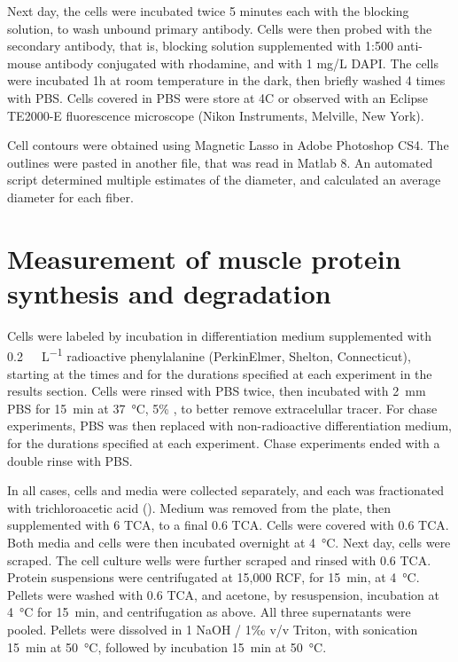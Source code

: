 \documentclass[12pt,english]{report}\usepackage[]{graphicx}\usepackage[]{color}
\begin{document}
Next day, the cells were incubated twice 5 minutes each with the blocking
solution, to wash unbound primary antibody. Cells were then probed
with the secondary antibody, that is, blocking solution supplemented
with 1:500 anti-mouse antibody conjugated with rhodamine, and with
1 mg/L DAPI. The cells were incubated 1h at room temperature in the
dark, then briefly washed 4 times with PBS. Cells covered in PBS were
store at 4C or observed with an Eclipse TE2000-E fluorescence microscope
(Nikon Instruments, Melville, New York).

Cell contours were obtained using Magnetic Lasso in Adobe Photoshop
CS4. The outlines were pasted in another file, that was read in Matlab
8. An automated script determined multiple estimates of the diameter,
and calculated an average diameter for each fiber.


\section{Measurement of muscle protein synthesis and degradation}

Cells were labeled by incubation in differentiation medium supplemented
with \SI{0.2}{\milli\curie\per\liter} radioactive phenylalanine (PerkinElmer,
Shelton, Connecticut), starting at the times and for the durations
specified at each experiment in the results section. Cells were rinsed
with PBS twice, then incubated with \SI{2}{\milli\meter} PBS for
\SI{15}{\minute} at \SI{37}{\celsius}, 5\% , to better
remove extracelullar tracer. For chase experiments, PBS was then replaced
with non-radioactive differentiation medium, for the durations specified
at each experiment. Chase experiments ended with a double rinse with
PBS.

In all cases, cells and media were collected separately, and each
was fractionated with trichloroacetic acid ().
Medium was removed from the plate, then supplemented with \SI{6}{\molar}
TCA, to a final \SI{0.6}{\molar} TCA. Cells were covered with \SI{0.6}{\molar}
TCA. Both media and cells were then incubated overnight at \SI{4}{\celsius}.
Next day, cells were scraped. The cell culture wells were further
scraped and rinsed with \SI{0.6}{\molar} TCA. Protein suspensions
were centrifugated at 15,000 RCF, for \SI{15}{\minute}, at \SI{4}{\celsius}.
Pellets were washed with \SI{0.6}{\molar} TCA, and acetone, by resuspension,
incubation at \SI{4}{\celsius} for \SI{15}{\minute}, and centrifugation
as above. All three supernatants were pooled. Pellets were dissolved
in \SI{1}{\molar} NaOH / 1‰ v/v Triton, with sonication \SI{15}{\minute}
at \SI{50}{\celsius}, followed by incubation \SI{15}{\minute} at
\SI{50}{\degreeCelsius}.
\end{document}
